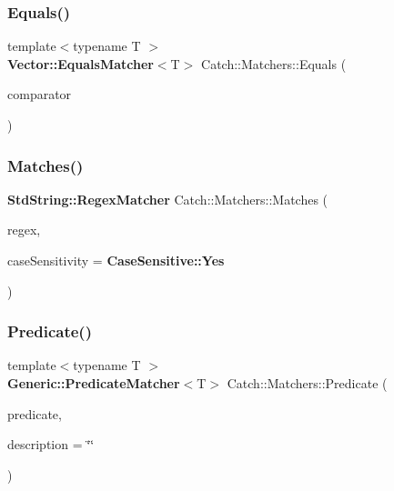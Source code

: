 \mbox{\label{namespace_catch_1_1_matchers_a332a401fb0da33c988e9cfa400ecce1b}} 
\subsubsection{Equals()\hspace{0.1cm}{\footnotesize\ttfamily [2/2]}}
{\footnotesize\ttfamily template$<$typename T $>$ \\
\textbf{ Vector\+::\+Equals\+Matcher}$<$T$>$ Catch\+::\+Matchers\+::\+Equals (\begin{DoxyParamCaption}\item[{std\+::vector$<$ T $>$ const \&}]{comparator }\end{DoxyParamCaption})}

\mbox{\label{namespace_catch_1_1_matchers_a82f1893cf50ae4c14b9b3e0980bf22b8}} 
\subsubsection{Matches()}
{\footnotesize\ttfamily \textbf{ Std\+String\+::\+Regex\+Matcher} Catch\+::\+Matchers\+::\+Matches (\begin{DoxyParamCaption}\item[{std\+::string const \&}]{regex,  }\item[{\textbf{ Case\+Sensitive\+::\+Choice}}]{case\+Sensitivity = {\ttfamily \textbf{ Case\+Sensitive\+::\+Yes}} }\end{DoxyParamCaption})}

\mbox{\label{namespace_catch_1_1_matchers_a034f2de6c0aac6f4a662fdf2558aedce}} 
\subsubsection{Predicate()}
{\footnotesize\ttfamily template$<$typename T $>$ \\
\textbf{ Generic\+::\+Predicate\+Matcher}$<$T$>$ Catch\+::\+Matchers\+::\+Predicate (\begin{DoxyParamCaption}\item[{std\+::function$<$ bool(T const \&)$>$ const \&}]{predicate,  }\item[{std\+::string const \&}]{description = {\ttfamily \char`\"{}\char`\"{}} }\end{DoxyParamCaption})}

